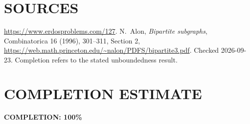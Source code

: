 \section{SOURCES}
\url{https://www.erdosproblems.com/127}.
N.~Alon, \emph{Bipartite subgraphs}, Combinatorica 16 (1996), 301--311,
Section 2, \url{https://web.math.princeton.edu/~nalon/PDFS/bipartite3.pdf}.
Checked 2026-09-23. Completion refers to the stated unboundedness result.

\section{COMPLETION ESTIMATE}
\textbf{COMPLETION: 100\%}
